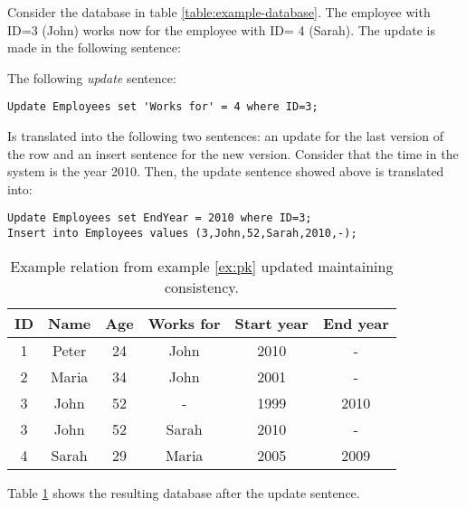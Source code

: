 \begin{example}
Consider the database in table \ref{table:example-database}. The employee with ID=3 (John) works now for the employee with ID= 4 (Sarah). The update is made in the following sentence:

The following \emph{update} sentence:

\begin{verbatim}
Update Employees set 'Works for' = 4 where ID=3;
\end{verbatim}

Is translated into the following two sentences: an update for the last version of the row and an insert sentence for the new version. Consider that the time in the  system is the year 2010. Then, the update sentence showed above is translated into:

\begin{verbatim}
Update Employees set EndYear = 2010 where ID=3;
Insert into Employees values (3,John,52,Sarah,2010,-);
\end{verbatim}


\begin{table}
\centering
\caption{Example relation from example \ref{ex:pk} updated maintaining consistency.}
\begin{tabular}{c c c c c c }
\hline
\textbf{ID} & \textbf{Name} & \textbf{Age} & \textbf{Works for} & \textbf{Start year} & \textbf{End year} \\ \hline
1 & Peter & 24 & John &  2010 & - \\
2 & Maria & 34 & John & 2001 & - \\
3 & John & 52 & - &  1999 & 2010 \\
3 & John & 52 & Sarah &  2010 & - \\
4 & Sarah & 29 & Maria &  2005 & 2009 \\
\hline 
\end{tabular}
\label{table:example-database-update}



\end{table}


Table \ref{table:example-database-update} shows the resulting database after the update sentence.

\end{example}


